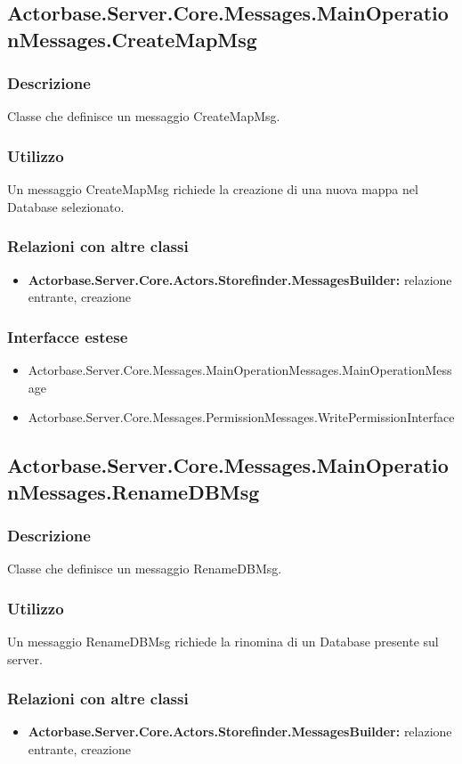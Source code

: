 \documentclass[a4paper]{article}
\begin{document}
			\subsection{Actorbase.Server.Core.Messages.MainOperationMessages.CreateMapMsg}
			\subsubsection{Descrizione}
				Classe che definisce un messaggio CreateMapMsg.
			\subsubsection{Utilizzo}
				Un messaggio CreateMapMsg richiede la creazione di una nuova mappa nel Database selezionato.
			\subsubsection{Relazioni con altre classi}
			\begin{itemize}
				\item \textbf{Actorbase.Server.Core.Actors.Storefinder.MessagesBuilder:} relazione entrante, creazione
			\end{itemize}
			\subsubsection{Interfacce estese}
			\begin{itemize}
				\item Actorbase.Server.Core.Messages.MainOperationMessages.MainOperationMessage
				\item Actorbase.Server.Core.Messages.PermissionMessages.WritePermissionInterface
			\end{itemize}

			\subsection{Actorbase.Server.Core.Messages.MainOperationMessages.RenameDBMsg}
			\subsubsection{Descrizione}
				Classe che definisce un messaggio RenameDBMsg.
			\subsubsection{Utilizzo}
				Un messaggio RenameDBMsg richiede la rinomina di un Database presente sul server.
			\subsubsection{Relazioni con altre classi}
			\begin{itemize}
				\item \textbf{Actorbase.Server.Core.Actors.Storefinder.MessagesBuilder:} relazione entrante, creazione
			\end{itemize}
\end{document}
